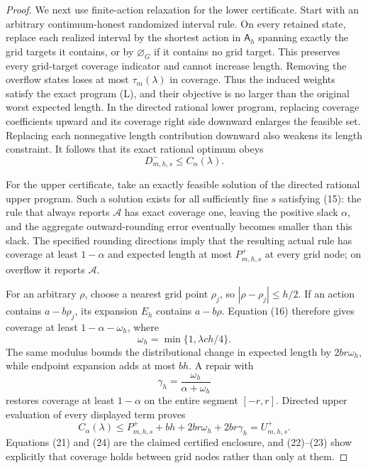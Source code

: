 \documentclass{article}
\begin{document}
\begin{proof}
We next use finite-action relaxation for the lower certificate.  Start
with an arbitrary continuum-honest randomized interval rule.  On every
retained state, replace each realized interval by the shortest action in
\(\mathsf A_h\) spanning exactly the grid targets it contains, or by
\(\varnothing_G\) if it contains no grid target.  This preserves every
grid-target coverage indicator and cannot increase length.  Removing the
overflow states loses at most \(\tau_m(\lambda)\) in coverage.  Thus the
induced weights satisfy the exact program (L), and their objective is no
larger than the original worst expected length.  In the directed rational
lower program, replacing coverage coefficients upward and its coverage
right side downward enlarges the feasible set.  Replacing each
nonnegative length contribution downward also weakens its length
constraint.  It follows that its exact rational optimum obeys
\[
 D_{m,h,s}^-\leq C_\alpha(\lambda).
 \tag{21}
\]

For the upper certificate, take an exactly feasible solution of the
directed rational upper program.  Such a solution exists for all
sufficiently fine \(s\) satisfying (15): the rule that always reports
\(\mathcal A\) has exact coverage one, leaving the positive slack
\(\alpha\), and the aggregate outward-rounding error eventually becomes
smaller than this slack.  The specified rounding directions imply that
the resulting actual rule has coverage at least \(1-\alpha\) and expected
length at most \(P_{m,h,s}^+\) at every grid node; on overflow it reports
\(\mathcal A\).

For an arbitrary \(\rho\), choose a nearest grid point \(\rho_j\), so
\(|\rho-\rho_j|\leq h/2\).  If an action contains
\(a-b\rho_j\), its expansion \(E_h\) contains \(a-b\rho\).  Equation
(16) therefore gives coverage at least \(1-\alpha-\omega_h\), where
\[
 \omega_h=\min\{1,\lambda ch/4\}.
 \tag{22}
\]
The same modulus bounds the distributional change in expected length by
\(2br\omega_h\), while endpoint expansion adds at most \(bh\).  A repair
with
\[
 \gamma_h=\frac{\omega_h}{\alpha+\omega_h}
 \tag{23}
\]
restores coverage at least \(1-\alpha\) on the entire segment
\([-r,r]\).  Directed upper evaluation of every displayed term proves
\[
 C_\alpha(\lambda)
 \leq P_{m,h,s}^++bh+2br\omega_h+2br\gamma_h
 =U_{m,h,s}^+.
 \tag{24}
\]
Equations (21) and (24) are the claimed certified enclosure, and (22)--(23)
show explicitly that coverage holds between grid nodes rather than only
at them.


\end{proof}
\end{document}
